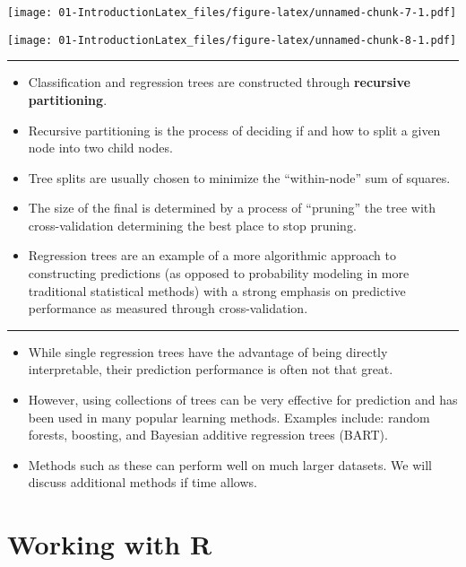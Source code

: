 \documentclass[]{book}
\begin{document}
\texttt{[image: 01-IntroductionLatex\_files/figure-latex/unnamed-chunk-7-1.pdf]}

\texttt{[image: 01-IntroductionLatex\_files/figure-latex/unnamed-chunk-8-1.pdf]}

\begin{center}\rule{0.5\linewidth}{\linethickness}\end{center}

\begin{itemize}
\item
  Classification and regression trees are constructed through \textbf{recursive partitioning}.
\item
  Recursive partitioning is the process of deciding if and how to split a given
  node into two child nodes.
\item
  Tree splits are usually chosen to minimize the ``within-node'' sum of squares.
\item
  The size of the final is determined by a process of ``pruning'' the tree
  with cross-validation determining the best place to stop pruning.
\item
  Regression trees are an example of a more algorithmic approach to
  constructing predictions (as opposed to probability modeling in more
  traditional statistical methods) with a strong emphasis on predictive
  performance as measured through cross-validation.
\end{itemize}

\begin{center}\rule{0.5\linewidth}{\linethickness}\end{center}

\begin{itemize}
\item
  While single regression trees have the advantage of being directly interpretable,
  their prediction performance is often not that great.
\item
  However, using collections of trees can be very effective for prediction and
  has been used in many popular learning methods. Examples include: random forests,
  boosting, and Bayesian additive regression trees (BART).
\item
  Methods such as these can perform well on much larger datasets. We will discuss
  additional methods if time allows.
\end{itemize}

\hypertarget{getting-started}{%
\chapter{Working with R}\label{getting-started}}
\end{document}
